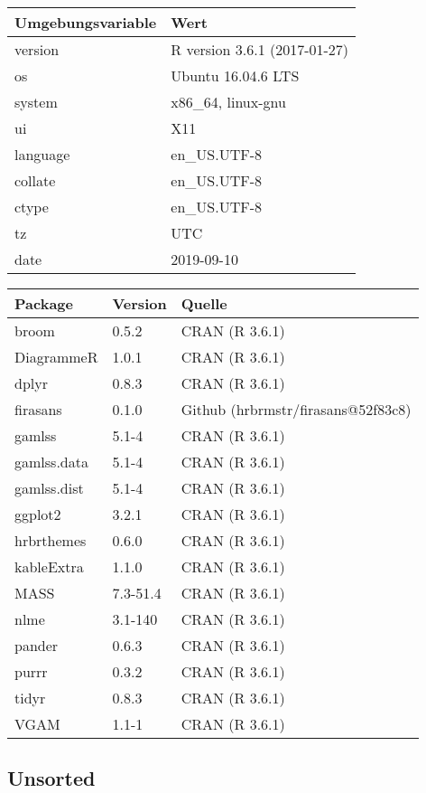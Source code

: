 \documentclass[ngerman,a4paper,]{scrartcl}
\theoremstyle{definition}
\theoremstyle{definition}
\theoremstyle{definition}
\theoremstyle{remark}
\begin{document}
\begin{table}[H]
\centering
\begin{tabular}{ll}
\toprule
Umgebungsvariable & Wert\\
\midrule
version & R version 3.6.1 (2017-01-27)\\
os & Ubuntu 16.04.6 LTS\\
system & x86\_64, linux-gnu\\
ui & X11\\
language & en\_US.UTF-8\\
collate & en\_US.UTF-8\\
ctype & en\_US.UTF-8\\
tz & UTC\\
date & 2019-09-10\\
\bottomrule
\end{tabular}
\end{table}

\begin{table}[H]
\centering
\begin{tabular}{lll}
\toprule
Package & Version & Quelle\\
\midrule
broom & 0.5.2 & CRAN (R 3.6.1)\\
DiagrammeR & 1.0.1 & CRAN (R 3.6.1)\\
dplyr & 0.8.3 & CRAN (R 3.6.1)\\
firasans & 0.1.0 & Github (hrbrmstr/firasans@52f83c8)\\
gamlss & 5.1-4 & CRAN (R 3.6.1)\\
gamlss.data & 5.1-4 & CRAN (R 3.6.1)\\
gamlss.dist & 5.1-4 & CRAN (R 3.6.1)\\
ggplot2 & 3.2.1 & CRAN (R 3.6.1)\\
hrbrthemes & 0.6.0 & CRAN (R 3.6.1)\\
kableExtra & 1.1.0 & CRAN (R 3.6.1)\\
MASS & 7.3-51.4 & CRAN (R 3.6.1)\\
nlme & 3.1-140 & CRAN (R 3.6.1)\\
pander & 0.6.3 & CRAN (R 3.6.1)\\
purrr & 0.3.2 & CRAN (R 3.6.1)\\
tidyr & 0.8.3 & CRAN (R 3.6.1)\\
VGAM & 1.1-1 & CRAN (R 3.6.1)\\
\bottomrule
\end{tabular}
\end{table}

\hypertarget{unsorted}{%
\subsection{Unsorted}\label{unsorted}}
\end{document}
